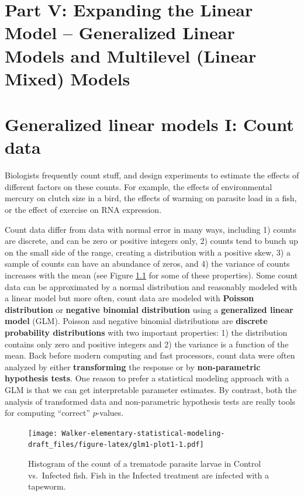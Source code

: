 \documentclass[]{book}
\begin{document}
\chapter*{Part V: Expanding the Linear Model -- Generalized Linear
Models and Multilevel (Linear Mixed)
Models}\label{part-v-expanding-the-linear-model-generalized-linear-models-and-multilevel-linear-mixed-models}

\chapter{Generalized linear models I: Count
data}\label{generalized-linear-models-i-count-data}

Biologists frequently count stuff, and design experiments to estimate
the effects of different factors on these counts. For example, the
effects of environmental mercury on clutch size in a bird, the effects
of warming on parasite load in a fish, or the effect of exercise on RNA
expression.

Count data differ from data with normal error in many ways, including 1)
counts are discrete, and can be zero or positive integers only, 2)
counts tend to bunch up on the small side of the range, creating a
distribution with a positive skew, 3) a sample of counts can have an
abundance of zeros, and 4) the variance of counts increases with the
mean (see Figure \ref{fig:glm1-plot1} for some of these properties).
Some count data can be approximated by a normal distribution and
reasonably modeled with a linear model but more often, count data are
modeled with \textbf{Poisson distribution} or \textbf{negative binomial
distribution} using a \textbf{generalized linear model} (GLM). Poisson
and negative binomial distributions are \textbf{discrete probability
distributions} with two important properties: 1) the distribution
contains only zero and positive integers and 2) the variance is a
function of the mean. Back before modern computing and fast processors,
count data were often analyzed by either \textbf{transforming} the
response or by \textbf{non-parametric hypothesis tests}. One reason to
prefer a statistical modeling approach with a GLM is that we can get
interpretable parameter estimates. By contrast, both the analysis of
transformed data and non-parametric hypothesis tests are really tools
for computing ``correct'' \(p\)-values.

\begin{figure}
\centering
\texttt{[image: Walker-elementary-statistical-modeling-draft\_files/figure-latex/glm1-plot1-1.pdf]}
\caption{\label{fig:glm1-plot1}Histogram of the count of a trematode
parasite larvae in Control vs.~Infected fish. Fish in the Infected
treatment are infected with a tapeworm.}
\end{figure}
\end{document}
